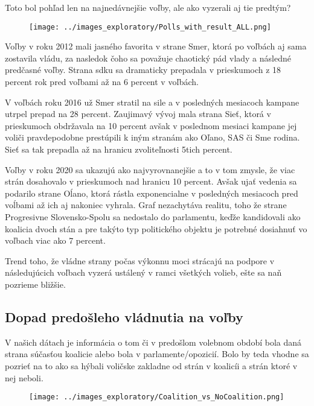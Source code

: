 \documentclass[main.tex]{subfiles}
\begin{document}
Toto bol pohľad len na najnedávnejšie voľby, ale ako vyzerali aj tie predtým?

\clearpage


\begin{figure}[!htbp]
    \centering
    \texttt{[image: ../images\_exploratory/Polls\_with\_result\_ALL.png]}
    \caption{}
    \label{fig:example}
\end{figure}

Voľby v roku 2012 mali jasného favorita v strane Smer, ktorá po voľbách aj sama zostavila vládu, za nasledok čoho sa považuje chaotický pád vlady a následné predčasné voľby. Strana sdku sa dramaticky prepadala v prieskumoch z 18 percent rok pred voľbami až na 6 percent v voľbách. 

V voľbách roku 2016 už Smer stratil na sile a v posledných mesiacoch kampane utrpel prepad na 28 percent. Zaujimavý vývoj mala strana Sieť, ktorá v prieskumoch obdržavala na 10 percent avšak v poslednom mesiaci kampane jej voliči pravdepodobne prestúpili k iným stranám ako Oľano, SAS či Sme rodina. Sieť sa tak prepadla až na hranicu zvoliteľnosti 5tich percent.

Voľby v roku 2020 sa ukazujú ako najvyrovnanejšie a to v tom zmysle, že viac strán dosahovalo v prieskumoch nad hranicu 10 percent. Avšak ujať vedenia sa podarilo strane Oĺano, ktorá rástla exponencialne v posledných mesiacoch pred voĺbami až ich aj nakoniec vyhrala. Graf nezachytáva realitu, toho že strane Progresivne Slovensko-Spolu sa nedostalo do parlamentu, keďže kandidovali ako koalicia dvoch stán a pre takýto typ politického objektu je potrebné dosiahnuť vo voľbach viac ako 7 percent. 

Trend toho, že vládne strany počas výkonnu moci strácajú na podpore v následujúcich voľbach vyzerá ustálený v ramci všetkých volieb, ešte sa naň pozrieme bližšie. 

\subsection{Dopad predošleho vládnutia na voľby}

V našich dátach je informácia o tom či v predošlom volebnom období bola daná strana súčasťou koalicie alebo bola v parlamente/opozicií. Bolo by teda vhodne sa pozrieť na to ako sa hýbali voličske zakladne od strán v koalicíi a strán ktoré v nej neboli. 
\begin{figure}[!htbp]
    \centering
    \texttt{[image: ../images\_exploratory/Coalition\_vs\_NoCoalition.png]}
    \caption{}
    \label{fig:example}
\end{figure}
\end{document}
